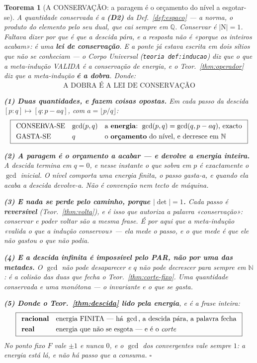 \documentclass[11pt,a4paper]{article}
\newtheorem{teorema}{Teorema}
\newcommand{\code}[1]{\texttt{\small #1}}
\newcommand{\abs}[1]{\lvert #1\rvert}
\begin{document}
\begin{teorema}[A CONSERVAÇÃO: a paragem é o orçamento do nível a esgotar-se]\label{thm:conservacao}
\emph{A quantidade conservada é a} \textbf{(D2)} \emph{da Def.~\ref{def:espaco}} --- a
norma, o produto do elemento pelo seu dual, que cai sempre em $\mathbb{Q}$. Conservar é
$\abs{\mathrm{N}}=1$.
Faltava dizer \emph{por que} é que a descida pára, e a resposta não é «porque os inteiros
acabam»: é uma \textbf{lei de conservação}. E a ponte já estava escrita em dois sítios que
não se conheciam --- o \emph{Corpo Universal} (\code{teoria def:inducao}) diz que \emph{o que
a meta-indução VALIDA é a conservação de energia}, e o Teor.~\ref{thm:operador} diz que a
meta-indução \textbf{é a dobra}. Donde:
\[
\boxed{\;\text{A DOBRA É A LEI DE CONSERVAÇÃO}\;}
\]

\textbf{(1) Duas quantidades, e fazem coisas opostas.} Em cada passo da descida
$[p{:}q]\mapsto[q:p-aq]$, com $a=\lfloor p/q\rfloor$:
\[
\boxed{
\begin{array}{lll}
\text{CONSERVA-SE} & \gcd(p,q) & \text{a \textbf{energia}: }\gcd(p,q)=\gcd(q,p-aq)\text{,
exacto}\\[3pt]
\text{GASTA-SE} & q & \text{o \textbf{orçamento} do nível, e decresce em }\mathbb{N}
\end{array}}
\]

\textbf{(2) A paragem é o orçamento a acabar --- e devolve a energia inteira.} A descida
termina em $q=0$, e nesse instante o que sobra em $p$ é \emph{exactamente} o
$\gcd$ inicial. \emph{O nível comporta uma energia finita, o passo gasta-a, e quando ela
acaba a descida devolve-a.} Não é convenção nem tecto de máquina.

\textbf{(3) E nada se perde pelo caminho, porque $\abs{\det}=1$.} Cada passo é
\textbf{reversível} (Teor.~\ref{thm:volta}), e é isso que autoriza a palavra
«conservação»: \emph{conservar e poder voltar são a mesma frase}. É por aqui que a
meta-indução «valida o que a indução conservou» --- ela mede o passo, e o que mede é que
ele não gastou o que não podia.

\textbf{(4) E a descida infinita é impossível pelo PAR, não por uma das metades.} O
$\gcd$ não pode desaparecer e $q$ não pode decrescer para sempre em $\mathbb{N}$: é a
colisão das duas que fecha o Teor.~\ref{thm:corte-fixo}. Uma quantidade conservada e uma
monótona --- \emph{o invariante e o que se gasta}.

\textbf{(5) Donde o Teor.~\ref{thm:descida} lido pela energia}, e é a frase inteira:
\[
\boxed{
\begin{array}{ll}
\text{\textbf{racional}} & \text{energia FINITA --- há }\gcd\text{, a descida pára, a
palavra fecha}\\[3pt]
\text{\textbf{real}} & \text{energia que não se esgota --- e é o \emph{corte}}
\end{array}}
\]
No ponto fixo $F$ vale $\pm1$ e nunca $0$, e o $\gcd$ dos convergentes vale sempre $1$:
\emph{a energia está lá, e não há passo que a consuma}. $\square$
\end{teorema}
\end{document}
